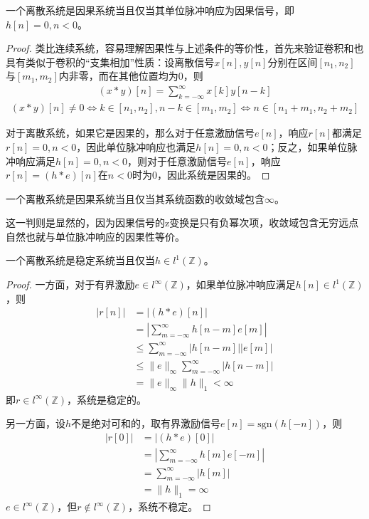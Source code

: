 \documentclass{ctexbook}
\begin{document}
\begin{proposition}[因果性的时域判则]
    一个离散系统是因果系统当且仅当其单位脉冲响应为因果信号，即$h[n]=0,n<0$。
\end{proposition}
\begin{proof}
    类比连续系统，容易理解因果性与上述条件的等价性，首先来验证卷积和也具有类似于卷积的“支集相加”性质：设离散信号$x[n],y[n]$分别在区间$[n_1,n_2]$与$[m_1,m_2]$内非零，而在其他位置均为0，则
    \begin{align*}
        (x*y)[n]=\sum_{k=-\infty}^{\infty}x[k]y[n-k]
    \end{align*}
    \begin{align*}
        (x*y)[n]\neq 0\iff k\in[n_1,n_2],n-k\in[m_1,m_2]\iff n\in[n_1+m_1,n_2+m_2]
    \end{align*}
    
    对于离散系统，如果它是因果的，那么对于任意激励信号$e[n]$，响应$r[n]$都满足$r[n]=0,n<0$，因此单位脉冲响应也满足$h[n]=0,n<0$；反之，如果单位脉冲响应满足$h[n]=0,n<0$，则对于任意激励信号$e[n]$，响应$r[n]=(h*e)[n]$在$n<0$时为0，因此系统是因果的。
\end{proof}

\begin{proposition}[因果性的z域判则]
    一个离散系统是因果系统当且仅当其系统函数的收敛域包含$\infty$。
\end{proposition}

这一判则是显然的，因为因果信号的z变换是只有负幂次项，收敛域包含无穷远点自然也就与单位脉冲响应的因果性等价。

\begin{proposition}[稳定性的时域判则]
    一个离散系统是稳定系统当且仅当$h\in l^1(\mathbb{Z})$。
\end{proposition}
\begin{proof}
    一方面，对于有界激励$e\in l^{\infty}(\mathbb{Z})$，如果单位脉冲响应满足$h[n]\in l^1(\mathbb{Z})$，则
    \begin{align*}
        |r[n]|&=|(h*e)[n]|\\
        &=\left|\sum_{m=-\infty}^{\infty}h[n-m]e[m]\right|\\
        &\leq \sum_{m=-\infty}^{\infty}|h[n-m]||e[m]|\\
        &\leq \|e\|_{\infty}\sum_{m=-\infty}^{\infty}|h[n-m]|\\
        &=\|e\|_{\infty}\|h\|_1<\infty
    \end{align*}
    即$r\in l^{\infty}(\mathbb{Z})$，系统是稳定的。
    
    另一方面，设$h$不是绝对可和的，取有界激励信号$e[n]=\text{sgn}(h[-n])$，则
    \begin{align*}
        |r[0]|&=|(h*e)[0]|\\
        &=\left|\sum_{m=-\infty}^{\infty}h[m]e[-m]\right|\\
        &=\sum_{m=-\infty}^{\infty}|h[m]|\\
        &=\|h\|_1=\infty
    \end{align*}
    $e\in l^{\infty}(\mathbb{Z})$，但$r\notin l^{\infty}(\mathbb{Z})$，系统不稳定。
\end{proof}
\end{document}
